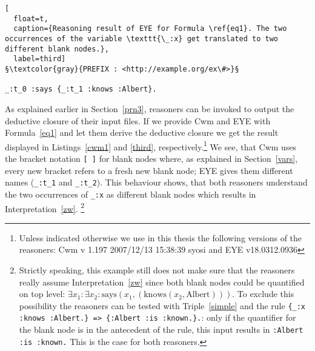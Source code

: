 \begin{lstlisting}[
  float=t,
  caption={Reasoning result of EYE for Formula \ref{eq1}. The two occurrences of the variable \texttt{\_:x} get translated to two different blank nodes.},
  label=third]
§\textcolor{gray}{PREFIX : <http://example.org/ex\#>}§

_:t_0 :says {_:t_1 :knows :Albert}.
\end{lstlisting}
As explained earlier in Section~\ref{prn3}, \nthree reasoners can be invoked to output the deductive closure of their input files. If we provide 
Cwm and EYE with Formula~\ref{eq1}  and let them derive the deductive closure we get the result displayed in Listings~\ref{cwm1} and \ref{third}, respectively.\footnote{
Unless indicated otherwise we use in this thesis the following versions of the reasoners:
Cwm v 1.197 2007/12/13 15:38:39 syosi and EYE v18.0312.0936}
We see, that Cwm uses the bracket notation \texttt{[~]}  for blank nodes where, as explained in Section~\ref{vars}, every new bracket refers to a fresh new blank node; 
EYE gives them different names (\texttt{\_:t\_1} and \texttt{\_:t\_2}). This behaviour shows, that both reasoners understand the two occurrences of \texttt{\_:x} as different 
blank nodes which results in Interpretation~\ref{zw}.%
\footnote{
Strictly speaking, this example still does not make sure that the reasoners really assume Interpretation~\ref{zw} since both blank nodes could be quantified on top level:
$\exists x_1 : \exists x_2: \text{says}(x_1, ( \text{knows}(x_2, \text{Albert})))$.
To exclude this possibility the reasoners can be tested with Triple~\ref{simple} and the rule \texttt{\{\_:x :knows :Albert.\} => \{:Albert :is :known.\}.}: only if 
the quantifier for the blank node is in the antecedent of the rule, this input results in \texttt{:Albert :is :known.} This is the case for both reasoners.
}


